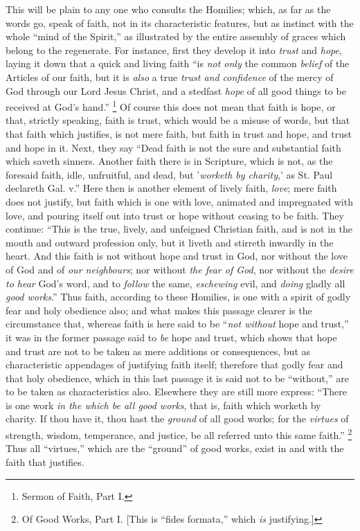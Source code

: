 This will be plain to any one who consults the Homilies; which, as
far as the words go, speak of faith, not in its characteristic
features, but as instinct with the whole ``mind of the
Spirit,'' as illustrated by the entire assembly of graces which
belong to the regenerate. For instance, first they develop it into \emph{trust}
and \emph{hope}, laying it down that a quick and living faith ``is
\emph{not only} the common \emph{belief} of the Articles of our faith,
but it is \emph{also} a true \emph{trust and confidence} of the mercy
of God through our Lord Jesus Christ, and a stedfast \emph{hope} of
all good things to be received at God's hand.'' \footnote{Sermon of
Faith, Part I.} Of course this does not mean that faith is hope, or that,
strictly speaking, faith is trust, which would be a misuse of words,
but that that faith which justifies, is not mere faith, but faith in
trust and hope, and trust and hope in it. Next, they say ``Dead
faith is not the sure and substantial faith which saveth sinners.
Another faith there is in Scripture, which is not, as the foresaid
faith, idle, unfruitful, and dead, but '\emph{worketh by charity},' as
St. Paul declareth Gal. v.'' Here then is another element of
lively faith, \emph{love}; mere faith does not justify, but
faith which is one with love, animated and impregnated with love, and
pouring itself out into trust or hope without ceasing to be faith.
They continue: ``This is the true, lively, and unfeigned Christian
faith, and is not in the mouth and outward profession only, but it
liveth and stirreth inwardly in the heart. And this faith is not
without hope and trust in God, nor without the love of God and of \emph{our
neighbours}; nor without \emph{the fear of God}, nor without the \emph{desire
to hear} God's word, and to \emph{follow} the same, \emph{eschewing}
evil, and \emph{doing} gladly all \emph{good works}.'' Thus faith,
according to these Homilies, is one with a spirit of godly fear and
holy obedience also; and what makes this passage clearer is the
circumstance that, whereas faith is here said to be ``\emph{not
without} hope and trust,'' it was in the former passage said to
\emph{be} hope and trust, which shows that hope and trust are not to
be taken as mere additions or consequences, but as characteristic
appendages of justifying faith itself; therefore that godly fear and
that holy obedience, which in this last passage it is said not to be
``without,'' are to be taken as characteristics also.
Elsewhere they are still more express: ``There is one work \emph{in
the which be all good works}, that is, faith which worketh by
charity. If thou have it, thou hast the \emph{ground} of all good
works; for the \emph{virtues} of strength, wisdom, temperance, and
justice, be all referred unto this same faith.'' \footnote{Of Good Works,
Part I. [This is ``fides formata,'' which \emph{is}
justifying.]} Thus all ``virtues,'' which are the ``ground''
of good works, exist in and with the faith that justifies.

